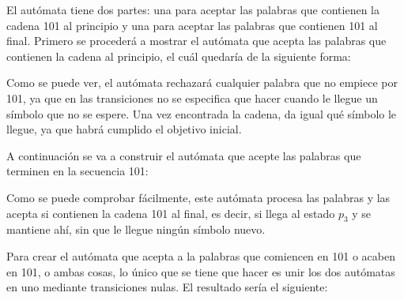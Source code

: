 \documentclass[11pt,a4paper]{article}
\begin{document}
		El autómata tiene dos partes: una para aceptar las palabras que contienen la cadena 101 al principio y una para
		aceptar las palabras que contienen 101 al final. Primero se procederá a mostrar el autómata que acepta las
		palabras que contienen la cadena al principio, el cuál quedaría de la siguiente forma:
		
		
		\begin{center}
		\end{center}
		
		Como se puede ver, el autómata rechazará cualquier palabra que no empiece por 101, ya que en las transiciones
		no se especifica que hacer cuando le llegue un símbolo que no se espere. Una vez encontrada la cadena, da igual
		qué símbolo le llegue, ya que habrá cumplido el objetivo inicial. \par
		
		A continuación se va a construir el autómata que acepte las palabras que terminen en la secuencia 101:
		
		\begin{center}
		\end{center}
		
		Como se puede comprobar fácilmente, este autómata procesa las palabras y las acepta si contienen la cadena 101 al
		final, es decir, si llega al estado $p_3$ y se mantiene ahí, sin que le llegue ningún símbolo nuevo. \par
		
		Para crear el autómata que acepta a la palabras que comiencen en 101 o acaben en 101, o ambas cosas, lo único que
		se tiene que hacer es unir los dos autómatas en uno mediante transiciones nulas. El resultado sería el siguiente:
		
\end{document}
